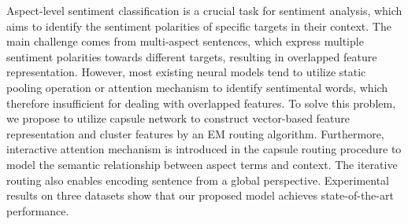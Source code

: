 Aspect-level sentiment classification is a crucial task for sentiment analysis, which aims to identify the sentiment polarities of specific targets in their context. 
The main challenge comes from multi-aspect sentences, which express multiple sentiment polarities towards different targets, resulting in overlapped feature representation.
However, most existing neural models tend to utilize static pooling operation or attention mechanism to identify sentimental words, which therefore insufficient for dealing with overlapped features.
To solve this problem, we propose to utilize capsule network to construct vector-based feature representation and cluster features by an EM routing algorithm.
Furthermore, interactive attention mechanism is introduced in the capsule routing procedure to model the semantic relationship between aspect terms and context.
The iterative routing also enables encoding sentence from a global perspective.
Experimental results on three datasets show that our proposed model achieves state-of-the-art performance.